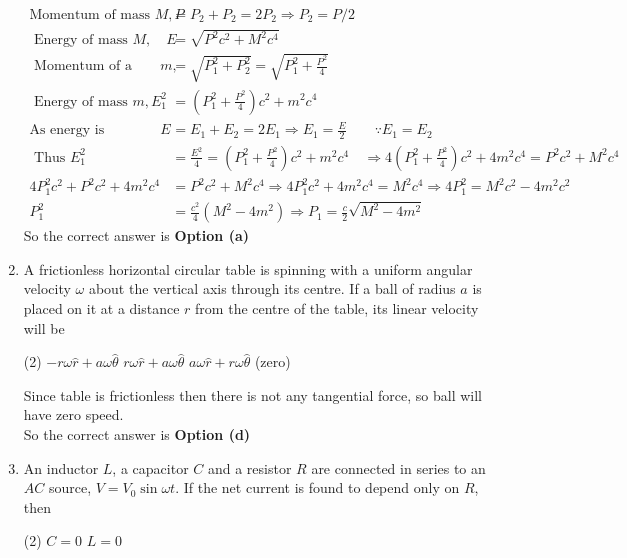 \begin{enumerate}
\begin{answer}
\begin{align*}
	\text{Momentum of mass }M, P&=P_{2}+P_{2}=2 P_{2} \Rightarrow P_{2}=P / 2\\
\text{	Energy of mass } M, \quad E&=\sqrt{P^{2} c^{2}+M^{2} c^{4}}\\
\text{	Momentum of a mass } m,&=\sqrt{P_{1}^{2}+P_{2}^{2}}=\sqrt{P_{1}^{2}+\frac{P^{2}}{4}}\\
\text{	Energy of mass }m, E_{1}^{2}&=\left(P_{1}^{2}+\frac{P^{2}}{4}\right) c^{2}+m^{2} c^{4}\\
	\text{As energy is conserved }E&=E_{1}+E_{2}=2 E_{1} \Rightarrow E_{1}=\frac{E}{2}\qquad \because E_{1}=E_{2}\\
\text{	Thus } E_{1}^{2}&=\frac{E^{2}}{4}=\left(P_{1}^{2}+\frac{P^{2}}{4}\right) c^{2}+m^{2} c^{4} \quad \Rightarrow 4\left(P_{1}^{2}+\frac{P^{2}}{4}\right) c^{2}+4 m^{2} c^{4}=P^{2} c^{2}+M^{2} c^{4} \\
4 P_{1}^{2} c^{2}+P^{2} c^{2}+4 m^{2} c^{4}&=P^{2} c^{2}+M^{2} c^{4} \Rightarrow 4 P_{1}^{2} c^{2}+4 m^{2} c^{4}=M^{2} c^{4} \Rightarrow 4 P_{1}^{2}=M^{2} c^{2}-4 m^{2} c^{2}\\ P_{1}^{2}&=\frac{c^{2}}{4}\left(M^{2}-4 m^{2}\right) \Rightarrow P_{1}=\frac{c}{2} \sqrt{M^{2}-4 m^{2}}
	\end{align*}
		So the correct answer is \textbf{Option (a)}
\end{answer}
\item A frictionless horizontal circular table is spinning with a uniform angular velocity $\omega$ about the vertical axis through its centre. If a ball of radius $a$ is placed on it at a distance $r$ from the centre of the table, its linear velocity will be
 \begin{tasks}(2)
	\task[\textbf{a.}]$-r \omega \hat{r}+a \omega \hat{\theta}$
	\task[\textbf{b.}]$r \omega \hat{r}+a \omega \hat{\theta}$
	\task[\textbf{c.}]$a \omega \hat{r}+r \omega \hat{\theta}$
	 (zero)
\end{tasks}
\begin{answer}
 Since table is frictionless then there is not any tangential force, so ball will have zero speed. \\
	So the correct answer is \textbf{Option (d)}
\end{answer}
\item An inductor $L$, a capacitor $C$ and a resistor $R$ are connected in series to an $A C$ source, $V=V_{0} \sin \omega t$. If the net current is found to depend only on $R$, then
 \begin{tasks}(2)
	\task[\textbf{a.}]$C=0$
	\task[\textbf{b.}]$L=0$

\end{tasks}
\end{enumerate}
